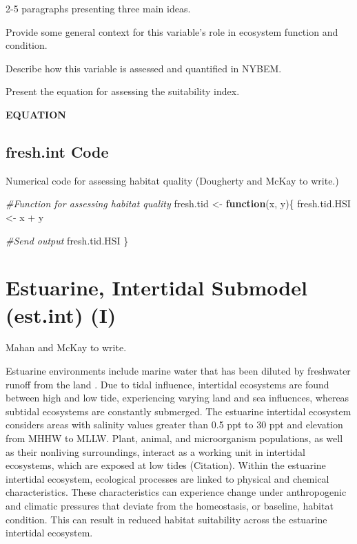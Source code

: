 \documentclass[
]{book}
\newenvironment{Shaded}{\begin{snugshade}}{\end{snugshade}}
\newcommand{\CommentTok}[1]{\textcolor[rgb]{0.56,0.35,0.01}{\textit{#1}}}
\newcommand{\ControlFlowTok}[1]{\textcolor[rgb]{0.13,0.29,0.53}{\textbf{#1}}}
\newcommand{\NormalTok}[1]{#1}
\newcommand{\OtherTok}[1]{\textcolor[rgb]{0.56,0.35,0.01}{#1}}
\newcommand{\SpecialCharTok}[1]{\textcolor[rgb]{0.00,0.00,0.00}{#1}}
\begin{document}
2-5 paragraphs presenting three main ideas.

Provide some general context for this variable's role in ecosystem function and condition.

Describe how this variable is assessed and quantified in NYBEM.

Present the equation for assessing the suitability index.

\textbf{EQUATION}

\hypertarget{fresh.int-code}{%
\subsection{fresh.int Code}\label{fresh.int-code}}

Numerical code for assessing habitat quality ({Dougherty and McKay to write.})

\begin{Shaded}
\begin{Highlighting}[]
\CommentTok{\#Function for assessing habitat quality}
\NormalTok{fresh.tid }\OtherTok{\textless{}{-}} \ControlFlowTok{function}\NormalTok{(x, y)\{}
\NormalTok{  fresh.tid.HSI }\OtherTok{\textless{}{-}}\NormalTok{ x }\SpecialCharTok{+}\NormalTok{ y}

  \CommentTok{\#Send output}
\NormalTok{  fresh.tid.HSI}
\NormalTok{\}}
\end{Highlighting}
\end{Shaded}

\hypertarget{estuarine-intertidal-submodel-est.int-i}{%
\section{Estuarine, Intertidal Submodel (est.int) (I)}\label{estuarine-intertidal-submodel-est.int-i}}

{Mahan and McKay to write.}

Estuarine environments include marine water that has been diluted by freshwater runoff from the land \citep{prosser_impacts_2018}. Due to tidal influence, intertidal ecosystems are found between high and low tide, experiencing varying land and sea influences, whereas subtidal ecosystems are constantly submerged. The estuarine intertidal ecosystem considers areas with salinity values greater than 0.5 ppt to 30 ppt and elevation from MHHW to MLLW. Plant, animal, and microorganism populations, as well as their nonliving surroundings, interact as a working unit in intertidal ecosystems, which are exposed at low tides (Citation). Within the estuarine intertidal ecosystem, ecological processes are linked to physical and chemical characteristics. These characteristics can experience change under anthropogenic and climatic pressures that deviate from the homeostasis, or baseline, habitat condition. This can result in reduced habitat suitability across the estuarine intertidal ecosystem.
\end{document}
